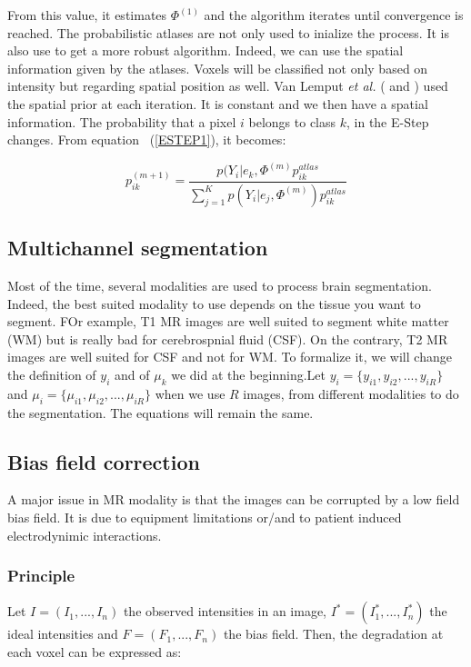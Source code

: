 From this value, it estimates $\Phi^{(1)}$ and the algorithm iterates until convergence is reached. The probabilistic atlases are not only used to inialize the process. It is also use to get a more robust algorithm. Indeed, we can use the spatial information given by the atlases. Voxels will be classified not only based on intensity but regarding spatial position as well. Van Lemput \textit{et al.} (\cite{8} and \cite{9}) used the spatial prior at each iteration. It is constant and we then have a spatial information. The probability that a pixel $i$ belongs to class $k$, in the E-Step changes. From equation ~(\ref{ESTEP1}), it becomes:

  \begin{equation*}\label{ESTEP2}
  p_{ik}^{(m+1)} = \frac{p(Y_i|e_k,\Phi^{(m)}p_{ik}^{atlas}}{\sum_{j=1}^K   p(Y_i|e_j,\Phi^{(m)}) p_{ik}^{atlas}}  
  \end{equation*}

%
\subsection{Multichannel segmentation}\label{multichannel}
Most of the time, several modalities are used to process brain segmentation. Indeed, the best suited modality to use depends on the tissue you want to segment. FOr example, T1 MR images are well suited to segment white matter (WM) but is really bad for cerebrospnial fluid (CSF). On the contrary, T2 MR images are well suited for CSF and not for WM. To formalize it, we will change the definition of $y_i$ and of $\mu_k$ we did at the beginning.Let $y_i = \{y_{i1},y_{i2}, ..., y_{iR}\}$ and $\mu_i = \{\mu_{i1},\mu_{i2}, ..., \mu_{iR}\}$ when we use $R$ images, from different modalities to do the segmentation. The equations will remain the same.
%
\subsection{Bias field correction}\label{biasfield}
A major issue in MR modality is that the images can be corrupted by a low field bias field. It is due to equipment limitations or/and to patient induced electrodynimic interactions.
%
\subsubsection{Principle}
Let $I=(I_1, ..., I_n)$ the observed intensities in an image, $I^*=(I_1^*, ..., I_n^*)$ the ideal intensities and $F=(F_1, ..., F_n)$ the bias field. Then, the degradation at each voxel can be expressed as:

